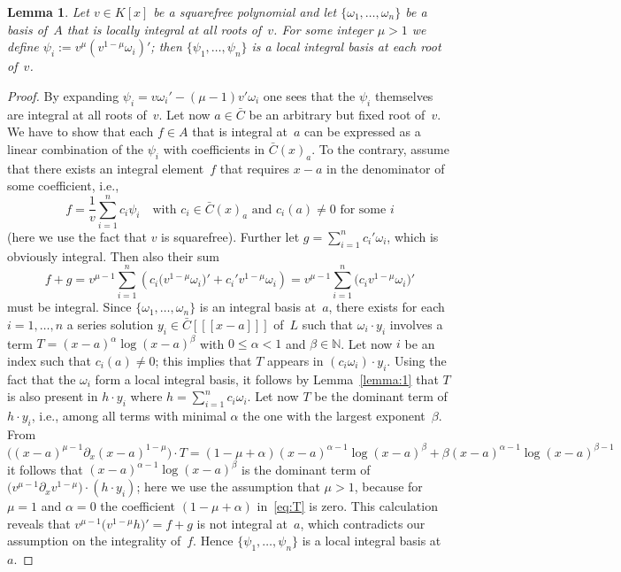 \documentclass[final,1p,times,authoryear]{elsarticle}
\newtheorem{lemma}[theorem]{Lemma}
\newcommand{\bN}{ {\mathbb N}}
\begin{document}
\begin{lemma}\label{lemma:ibv}
Let $v\in K[x]$ be a squarefree polynomial and let $\{\omega_1,\ldots,\omega_n\}$
be a basis of~$A$ that is locally integral at all roots of~$v$.
For some integer $\mu>1$ we define $\psi_i:=v^\mu\left(v^{1-\mu}\omega_i\right)'$; then
$\{\psi_1,\ldots,\psi_n\}$ is a local integral basis at each root of~$v$.
\end{lemma}
\begin{proof}
By expanding $\psi_i=v\omega_i'-(\mu-1)v'\omega_i$ one sees that the $\psi_i$
themselves are integral at all roots of~$v$. Let now $a\in\bar{C}$ be an
arbitrary but fixed root of~$v$. We have to show that each $f\in A$ that is
integral at~$a$ can be expressed as a linear combination of the $\psi_i$ with
coefficients in $\bar C(x)_a$. To the contrary, assume that there exists an
integral element~$f$ that requires $x-a$ in the denominator of some
coefficient, i.e.,
\[
  f = \frac{1}{v} \sum_{i=1}^n c_i \psi_i \quad\text{with }c_i\in \bar{C}(x)_a
  \text{ and } c_i(a)\neq0 \text{ for some } i
\]
(here we use the fact that $v$ is squarefree).  Further let $g=\sum_{i=1}^n
c_i'\omega_i$, which is obviously integral. Then also their sum
\[
  f+g = v^{\mu-1} \sum_{i=1}^n \left(c_i\bigl(v^{1-\mu}\omega_i\bigr)'
  + c_i'v^{1-\mu}\omega_i \right)
  = v^{\mu-1} \sum_{i=1}^n \bigl(c_iv^{1-\mu}\omega_i\bigr)'
\]
must be integral. Since $\{\omega_1,\ldots,\omega_n\}$ is an integral basis at~$a$,
there exists for each $i=1,\ldots,n$ a series solution $y_i\in\bar C[[[x-a]]]$
of~$L$ such that $\omega_i\cdot y_i$ involves a term
$T=(x-a)^\alpha\log(x-a)^\beta$ with $0\leq\alpha<1$ and $\beta\in\bN$.
Let now $i$ be an index such that $c_i(a)\neq0$;
this implies that $T$ appears in $(c_i\omega_i)\cdot y_i$.
Using the fact that the $\omega_i$ form a local integral basis, it follows by
Lemma~\ref{lemma:1} that $T$ is also present in $h\cdot y_i$ where
$h=\sum_{i=1}^n c_i\omega_i$. Let now $T$ be the dominant term of $h\cdot y_i$,
i.e., among all terms with minimal $\alpha$ the one with the largest exponent~$\beta$.
From
\begin{equation}\label{eq:T}
  \bigl((x-a)^{\mu-1} \partial_x (x-a)^{1-\mu}\bigr) \cdot T =
  (1-\mu+\alpha)(x-a)^{\alpha-1}\log(x-a)^\beta + \beta(x-a)^{\alpha-1}\log(x-a)^{\beta-1}
\end{equation}
it follows that $(x-a)^{\alpha-1}\log(x-a)^\beta$ is the dominant term of
$\bigl(v^{\mu-1}\partial_xv^{1-\mu}\bigr)\cdot (h\cdot y_i)$; here we use the
assumption that $\mu>1$, because for $\mu=1$ and $\alpha=0$ the
coefficient $(1-\mu+\alpha)$ in~\eqref{eq:T} is zero. This calculation reveals that
$v^{\mu-1}\bigl(v^{1-\mu}h\bigr)'=f+g$ is not integral at~$a$, which contradicts our assumption on
the integrality of~$f$. Hence $\{\psi_1,\ldots,\psi_n\}$ is a local integral
basis at~$a$.
\end{proof}
\end{document}
